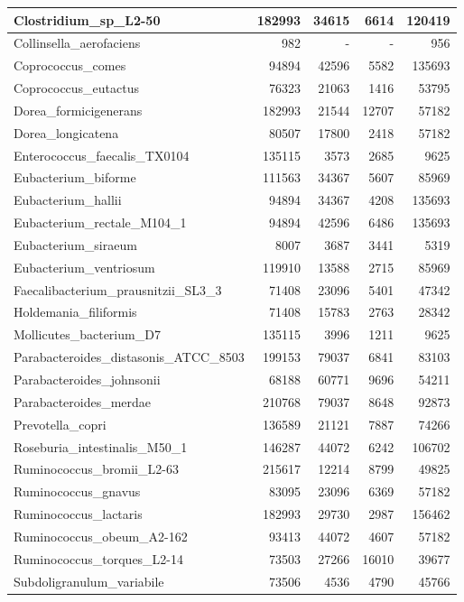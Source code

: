 \documentclass[12pt,a4paper]{article}
\begin{document}
\begin{table}[ht]
\begin{center}
\begin{tabular}{|l*{4}{|r}|}
Clostridium\_sp\_L2-50 & 182993 & 34615 & 6614 & 120419 \\ \hline
Collinsella\_aerofaciens & 982 & - & - & 956 \\ \hline
Coprococcus\_comes & 94894 & 42596 & 5582 & 135693 \\ \hline
Coprococcus\_eutactus & 76323 & 21063 & 1416 & 53795 \\ \hline
Dorea\_formicigenerans & 182993 & 21544 & 12707 & 57182 \\ \hline
Dorea\_longicatena & 80507 & 17800 & 2418 & 57182 \\ \hline
Enterococcus\_faecalis\_TX0104 & 135115 & 3573 & 2685 & 9625 \\ \hline
Eubacterium\_biforme & 111563 & 34367 & 5607 & 85969 \\ \hline
Eubacterium\_hallii & 94894 & 34367 & 4208 & 135693 \\ \hline
Eubacterium\_rectale\_M104\_1 & 94894 & 42596 & 6486 & 135693 \\ \hline
Eubacterium\_siraeum & 8007 & 3687 & 3441 & 5319 \\ \hline
Eubacterium\_ventriosum & 119910 & 13588 & 2715 & 85969 \\ \hline
Faecalibacterium\_prausnitzii\_SL3\_3 & 71408 & 23096 & 5401 & 47342 \\ \hline
Holdemania\_filiformis & 71408 & 15783 & 2763 & 28342 \\ \hline
Mollicutes\_bacterium\_D7 & 135115 & 3996 & 1211 & 9625 \\ \hline
Parabacteroides\_distasonis\_ATCC\_8503 & 199153 & 79037 & 6841 & 83103 \\ \hline
Parabacteroides\_johnsonii & 68188 & 60771 & 9696 & 54211 \\ \hline
Parabacteroides\_merdae & 210768 & 79037 & 8648 & 92873 \\ \hline
Prevotella\_copri & 136589 & 21121 & 7887 & 74266 \\ \hline
Roseburia\_intestinalis\_M50\_1 & 146287 & 44072 & 6242 & 106702 \\ \hline
Ruminococcus\_bromii\_L2-63 & 215617 & 12214 & 8799 & 49825 \\ \hline
Ruminococcus\_gnavus & 83095 & 23096 & 6369 & 57182 \\ \hline
Ruminococcus\_lactaris & 182993 & 29730 & 2987 & 156462 \\ \hline
Ruminococcus\_obeum\_A2-162 & 93413 & 44072 & 4607 & 57182 \\ \hline
Ruminococcus\_torques\_L2-14 & 73503 & 27266 & 16010 & 39677 \\ \hline
Subdoligranulum\_variabile & 73506 & 4536 & 4790 & 45766 \\ \hline
\end{tabular}
\end{center}
\end{table}
\end{document}

